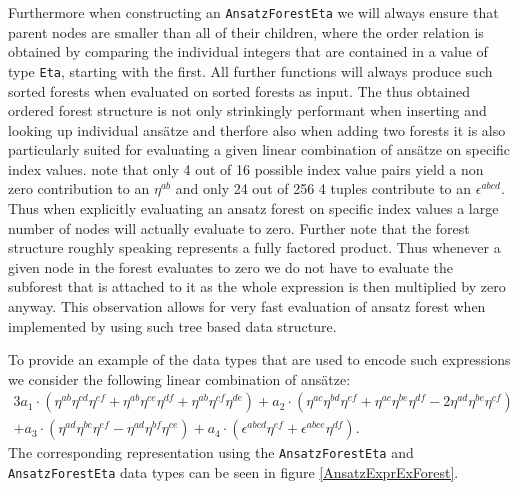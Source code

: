 \documentclass[a4paper,12pt, DIV=14, BCOR=5mm, twoside, headsepline]{scrbook}
\begin{document}
Furthermore when constructing an \texttt{AnsatzForestEta} we will always ensure that parent nodes are smaller than all of their children, where the order relation is obtained by comparing the individual integers that are contained in a value of type \texttt{Eta}, starting with the first. All further functions will always produce such sorted forests when evaluated on sorted forests as input. 
The thus obtained ordered forest structure is not only strinkingly performant when inserting and looking up individual ansätze and therfore also when adding two forests it is also particularly suited for evaluating a given linear combination of ansätze on specific index values. note that only 4 out of 16 possible index value pairs yield a non zero contribution to an $\eta^{ab}$ and only 24 out of 256 4 tuples contribute to an $\epsilon^{abcd}$. Thus when explicitly evaluating an ansatz forest on specific index values a large number of nodes will actually evaluate to zero. Further note that the forest structure roughly speaking represents a fully factored product. Thus whenever a given node in the forest evaluates to zero we do not have to evaluate the subforest that is attached to it as the whole expression is then multiplied by zero anyway. This observation allows for very fast evaluation of ansatz forest when implemented by using such tree based data structure. 

To provide an example of the data types that are used to encode such expressions we consider the following linear combination of ansätze:
\begin{multline}\label{AnsatzExprEx}
3a_1 \cdot \left (\eta^{ab}\eta^{cd}\eta^{ef} + \eta^{ab}\eta^{ce}\eta^{df} + \eta^{ab}\eta^{cf}\eta^{de} \right ) + a_2 \cdot \left ( \eta^{ac} \eta^{bd} \eta^{ef} + \eta^{ac} \eta^{be} \eta^{df} -2 \eta^{ad} \eta^{be} \eta^{cf} \right ) \\
+ a_3 \cdot \left ( \eta^{ad} \eta^{bc} \eta^{ef} - \eta^{ad} \eta^{bf} \eta^{ce} \right ) + a_4 \cdot \left ( \epsilon^{abcd} \eta^{ef} + \epsilon^{abce} \eta^{df}  \right )   .
\end{multline}
The corresponding representation using the \texttt{AnsatzForestEta} and \texttt{AnsatzForestEta} data types can be seen in figure \ref{AnsatzExprExForest}.\\
\end{document}
